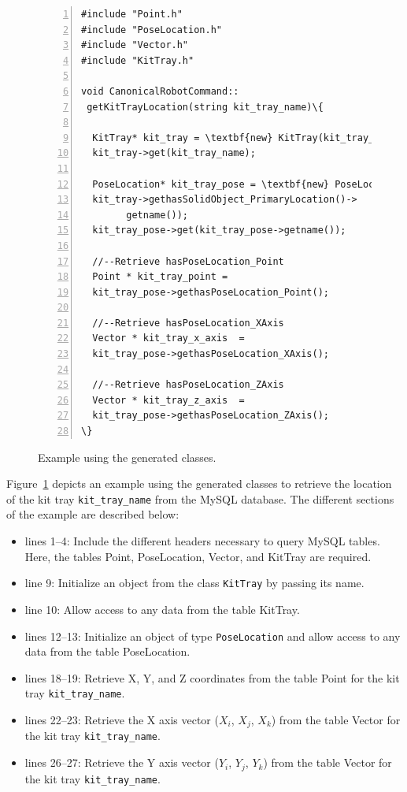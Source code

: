 \begin{figure}[t!h!]
\begin{minipage}{.50\paperwidth}
\begin{mylisting}
\begin{Verbatim}[commandchars=\\\{\},fontsize=\footnotesize, numbers=left, numbersep=2pt]
#include "Point.h"
#include "PoseLocation.h"
#include "Vector.h"
#include "KitTray.h"

void CanonicalRobotCommand::
 getKitTrayLocation(string kit_tray_name)\{

  KitTray* kit_tray = \textbf{new} KitTray(kit_tray_name);
  kit_tray->get(kit_tray_name);

  PoseLocation* kit_tray_pose = \textbf{new} PoseLocation(
  kit_tray->gethasSolidObject_PrimaryLocation()->
 		getname());
  kit_tray_pose->get(kit_tray_pose->getname());

  //--Retrieve hasPoseLocation_Point
  Point * kit_tray_point =
  kit_tray_pose->gethasPoseLocation_Point();

  //--Retrieve hasPoseLocation_XAxis
  Vector * kit_tray_x_axis  =
  kit_tray_pose->gethasPoseLocation_XAxis();

  //--Retrieve hasPoseLocation_ZAxis
  Vector * kit_tray_z_axis  =
  kit_tray_pose->gethasPoseLocation_ZAxis();
\}
\end{Verbatim}
\end{mylisting}
\end{minipage}
\caption{Example using the generated {\cpp} classes.}
\label{fig:exampleofuse}
\end{figure}


Figure~\ref{fig:exampleofuse} depicts an example using the generated classes to retrieve the location of the kit tray \texttt{kit\_tray\_name} from the MySQL database. The different sections of the example are described below:

\begin{itemize}
\item lines 1--4: Include the different headers necessary to query MySQL tables. Here, the tables Point, PoseLocation, Vector, and KitTray are required.
\item line 9: Initialize an object from the class \texttt{KitTray} by passing its name.
\item line 10: Allow access to any data from the table KitTray.
\item lines 12--13: Initialize an object of type \texttt{PoseLocation} and allow access to any data from the table PoseLocation.
\item lines 18--19: Retrieve X, Y, and Z coordinates from the table Point for the kit tray \texttt{kit\_tray\_name}.
\item lines 22--23: Retrieve the X axis vector ($X_i$, $X_j$, $X_k$) from the table Vector for the kit tray \texttt{kit\_tray\_name}.
\item lines 26--27: Retrieve the Y axis vector ($Y_i$, $Y_j$, $Y_k$) from the table Vector for the kit tray \texttt{kit\_tray\_name}.
\end{itemize}
